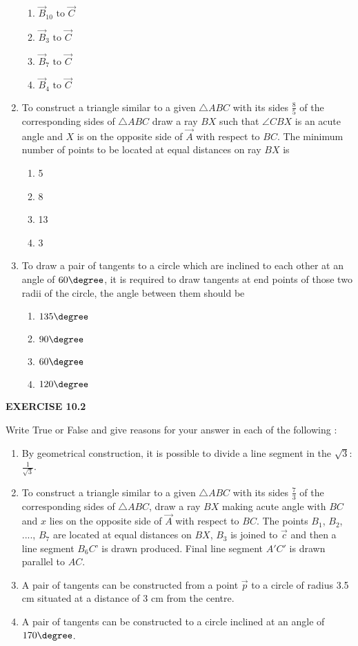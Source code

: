 \begin{enumerate}
\begin{enumerate}
	\item $\vec{B}_{10}\text{ to }\vec{C}$
\item $\vec{B}_3\text{ to }\vec{C}$ 
\item $\vec{B}_7\text{ to }\vec{C}$
\item $\vec{B}_4\text{ to }\vec{C}$
\end{enumerate}
\item To construct a triangle similar to a given $\triangle{ABC}$ with its sides $\frac{8}{5}$ of the corresponding sides of $\triangle{ABC}$ draw a ray $BX$ such that $\angle{CBX}$ is an acute angle and $X$ is on the opposite side of $\vec{A}$ with respect to $BC$. The minimum number of points to be located at equal distances on ray $BX$ is 
\begin{enumerate}
\item 5
\item 8
\item 13
\item 3
\end{enumerate}
\item To draw a pair of tangents to a circle which are inclined to each other at an angle of $60\degree$, it is required
to draw tangents at end points of those two radii of the circle, the angle between them should be 
\begin{enumerate}
\item $135\degree$
\item $90\degree$
\item $60\degree$
\item $120\degree$ 
\end{enumerate}
\end{enumerate}
\iffalse
\begin{center}                            \textbf{EXERCISE 10.2}                    \end{center}
Write True or False and give reasons for your answer in each of the following :
\begin{enumerate}
	\item By geometrical construction, it is possible to divide a line segment in the $\sqrt{3}$: $\frac{1}{\sqrt{3}}$.
\item To construct a triangle similar to a given $\triangle{ABC}$ with its sides $\frac{7}{3}$ of the corresponding sides of $\triangle{ABC}$, draw a ray $BX$ making acute angle with $BC$ and $x$ lies on 
the opposite side of $\vec{A}$ with respect to $BC$. The points $B_1$, $B_2$, ...., $B_7$ are located at equal distances on $BX$, $B_3$ is joined to $\vec{c}$ and then a line segment $B_6C$' is drawn produced. Final line segment $A'C'$ is drawn parallel to $AC$.
\item A pair of tangents can be constructed from a point $\vec{p}$ to a circle of radius 3.5 cm situated at a distance of 3 cm from the centre.
\item A pair of tangents can be constructed to a circle inclined at an angle of $170\degree$.
\end{enumerate}
